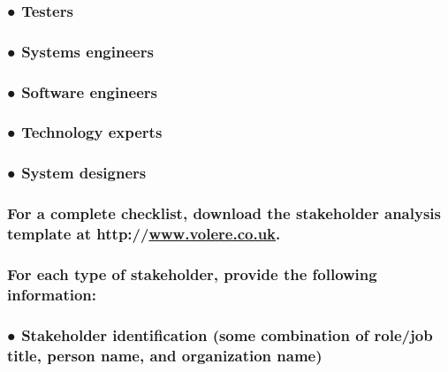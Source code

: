 \documentclass[
]{article}
\begin{document}
\hypertarget{testers}{%
\subsubsection{● Testers}\label{testers}}

\hypertarget{systems-engineers}{%
\subsubsection{● Systems engineers}\label{systems-engineers}}

\hypertarget{software-engineers}{%
\subsubsection{● Software engineers}\label{software-engineers}}

\hypertarget{technology-experts}{%
\subsubsection{● Technology experts}\label{technology-experts}}

\hypertarget{system-designers}{%
\subsubsection{● System designers}\label{system-designers}}

\hypertarget{for-a-complete-checklist-download-the-stakeholder-analysis-template-at-httpwww.volere.co.uk.}{%
\subsubsection{\texorpdfstring{For a complete checklist, download the
stakeholder analysis template at
http://\href{http://www.volere.co.uk/}{www.volere.co.uk}.}{For a complete checklist, download the stakeholder analysis template at http://www.volere.co.uk.}}\label{for-a-complete-checklist-download-the-stakeholder-analysis-template-at-httpwww.volere.co.uk.}}

\hypertarget{for-each-type-of-stakeholder-provide-the-following-information}{%
\subsubsection{For each type of stakeholder, provide the following
information:}\label{for-each-type-of-stakeholder-provide-the-following-information}}

\hypertarget{stakeholder-identification-some-combination-of-rolejob-title-person-name-and-organization-name}{%
\subsubsection{● Stakeholder identification (some combination of
role/job title, person name, and organization
name)}\label{stakeholder-identification-some-combination-of-rolejob-title-person-name-and-organization-name}}
\end{document}
